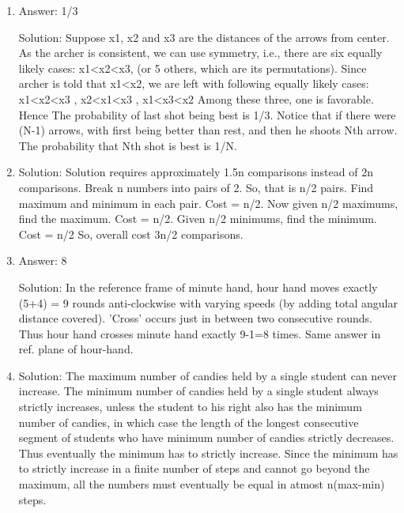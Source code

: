 \begin{enumerate}

\item
Answer: 1/3
 
Solution: Suppose x1, x2 and x3 are the distances of the arrows from center. As the archer is consistent, we can use symmetry, i.e., there are six equally likely cases: x1<x2<x3, (or 5 others, which are its permutations). Since archer is told that x1<x2, we are left with following equally likely cases:
x1<x2<x3 , x2<x1<x3 , x1<x3<x2
Among these three, one is favorable. Hence The probability of last shot being best is 1/3.
Notice that if there were (N-1) arrows, with first being better than rest, and then he shoots Nth arrow. The probability that Nth shot is best is 1/N.




\item
Solution: Solution requires approximately 1.5n comparisons instead of 2n comparisons.
Break n numbers into pairs of 2.
So, that is n/2 pairs. Find maximum and minimum in each pair. Cost = n/2.
Now given n/2 maximums, find the maximum. Cost = n/2. Given n/2 minimums, find the minimum. Cost = n/2
So, overall cost 3n/2 comparisons.




\item
Answer: 8
 
Solution: In the reference frame of minute hand, hour hand moves exactly (5+4) = 9 rounds anti-clockwise with varying speeds (by adding total angular distance covered). 'Cross' occurs just in between two consecutive rounds. Thus hour hand crosses minute hand exactly 9-1=8 times. Same answer in ref. plane of hour-hand.




\item
Solution: The maximum number of candies held by a single student can never increase.
The minimum number of candies held by a single student always strictly increases, unless the student to his right also has the minimum number of candies, in which case the length of the longest consecutive segment of students who have minimum number of candies strictly decreases. Thus eventually the minimum has to strictly increase.
Since the minimum has to strictly increase in a finite number of steps and cannot go beyond the maximum, all the numbers must eventually be equal in atmost n(max-min) steps.




\end{enumerate}
